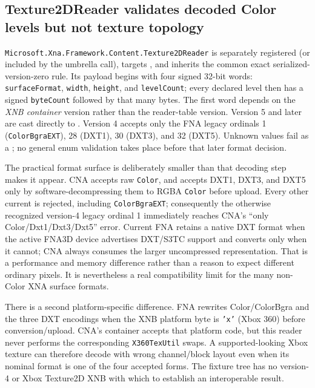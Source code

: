 \subsection{Texture2DReader validates decoded Color levels but not texture topology}
\label{sec:xnb-texture2d-reader-contract}

\texttt{Microsoft.Xna.Framework.Content.Texture2DReader} is separately registered (or included
by the umbrella call), targets , and inherits the common exact
serialized-version-zero rule. Its payload begins with four signed 32-bit words:
\texttt{surfaceFormat}, \texttt{width}, \texttt{height}, and \texttt{levelCount}; every declared
level then has a signed \texttt{byteCount} followed by that many bytes. The first word depends on
the \emph{XNB container} version rather than the reader-table version. Version 5 and later are
cast directly to . Version 4 accepts only the FNA legacy ordinals 1
(\texttt{ColorBgraEXT}), 28 (DXT1), 30 (DXT3), and 32 (DXT5). Unknown values fail as a
; no general enum validation takes place before that later
format decision.

The practical format surface is deliberately smaller than that decoding step makes it appear.
CNA accepts raw \texttt{Color}, and accepts DXT1, DXT3, and DXT5 only by software-decompressing
them to RGBA \texttt{Color} before upload. Every other current  is
rejected, including \texttt{ColorBgraEXT}; consequently the otherwise recognized version-4
legacy ordinal 1 immediately reaches CNA's ``only Color/Dxt1/Dxt3/Dxt5'' error. Current FNA
retains a native DXT format when the active FNA3D device advertises DXT/S3TC support and converts
only when it cannot; CNA always consumes the larger uncompressed representation. That is a
performance and memory difference rather than a reason to expect different ordinary pixels.
It is nevertheless a real compatibility limit for the many non-Color XNA surface formats.

There is a second platform-specific difference. FNA rewrites Color/ColorBgra and the three DXT
encodings when the XNB platform byte is \texttt{'x'} (Xbox 360) before conversion/upload. CNA's
container accepts that platform code, but this reader never performs the corresponding
\texttt{X360TexUtil} swaps. A supported-looking Xbox texture can therefore decode with wrong
channel/block layout even when its nominal format is one of the four accepted forms. The fixture
tree has no version-4 or Xbox Texture2D XNB with which to establish an interoperable result.

